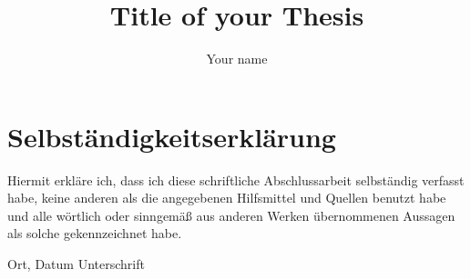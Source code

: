 \documentclass{mimosis}
\title{Title of your Thesis}
\author{Your name}
\theoremstyle{definition}
\theoremstyle{remark}
\begin{document}
\frontmatter

  
  \setcounter{page}{1}
  

  \tableofcontents

\mainmatter

  

  
  
  
  
  
  
  

\backmatter
  \printbibliography

  \thispagestyle{empty}
  \chapter*{Selbständigkeitserklärung}
  Hiermit erkläre ich, dass ich diese schriftliche Abschlussarbeit selbständig verfasst habe, keine
  anderen als die angegebenen Hilfsmittel und Quellen benutzt habe und alle wörtlich oder
  sinngemäß aus anderen Werken übernommenen Aussagen als solche gekennzeichnet habe.
  
  \vspace{1cm} 
  \noindent
  \hrulefill \hspace{2.5cm} \hrulefill
  
  \noindent
  Ort, Datum \hfill Unterschrift
\end{document}
